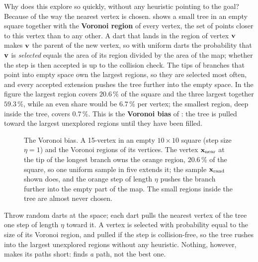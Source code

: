 Why does this explore so quickly, without any heuristic pointing to the
goal? Because of the way the nearest vertex is chosen.
 shows a small tree in an empty square together with
the \textbf{Voronoi region} of every vertex, the set of
points closer to this vertex than to any other. A dart that lands in the
region of vertex $\mathbf{v}$ makes $\mathbf{v}$ the parent of the new vertex, so with uniform
darts the probability that $\mathbf{v}$ is \emph{selected} equals the area of its
region divided by the area of the map; whether the step is then accepted is
up to the collision check. The tips of branches that point into empty space
own the largest regions, so they are selected most often, and every accepted
extension pushes the tree further into the empty space. In the figure the
largest region covers $20.6\,\%$ of the square and the three largest
together $59.3\,\%$, while an even share would be $6.7\,\%$ per vertex; the
smallest region, deep inside the tree, covers $0.7\,\%$. This is the
\textbf{Voronoi bias} of \rrt:
the tree is pulled toward the largest unexplored regions until they have
been filled.

\begin{figure}[tb]
  \centering
  \caption{The Voronoi bias. A 15-vertex \rrt in an empty $10\times10$ square
  (step size $\eta=1$) and the Voronoi regions of its vertices. The vertex
  $\mathbf{x}_{\mathrm{near}}$ at the tip of the longest branch owns the orange region,
  $20.6\,\%$ of the square, so one uniform sample in five extends it; the
  sample $\mathbf{x}_{\mathrm{rand}}$ shown does, and the orange step of length $\eta$
  pushes the branch further into the empty part of the map. The small regions
  inside the tree are almost never chosen.}
  \label{fig:ch16-voronoi}
\end{figure}

\begin{keyidea}
Throw random darts at the space; each dart pulls the nearest vertex of the
tree one step of length $\eta$ toward it. A vertex is selected with
probability equal to the size of its Voronoi region, and pulled if the step
is collision-free, so the tree rushes into
the largest unexplored regions without any heuristic. Nothing, however,
makes its paths short: \rrt finds \emph{a} path, not the best one.
\end{keyidea}

